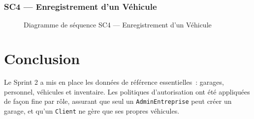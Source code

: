 \documentclass[12pt,a4paper]{report}
\begin{document}
\subsubsection*{SC4 — Enregistrement d'un Véhicule}

\begin{figure}[H]
\centering
{}%
\caption{Diagramme de séquence SC4 — Enregistrement d'un Véhicule}
\label{fig:seq-vehicle}
\end{figure}

\section{Conclusion}

Le Sprint 2 a mis en place les données de référence essentielles~: garages,
personnel, véhicules et inventaire. Les politiques d'autorisation ont été
appliquées de façon fine par rôle, assurant que seul un \texttt{AdminEntreprise}
peut créer un garage, et qu'un \texttt{Client} ne gère que ses propres véhicules.

\end{document}
